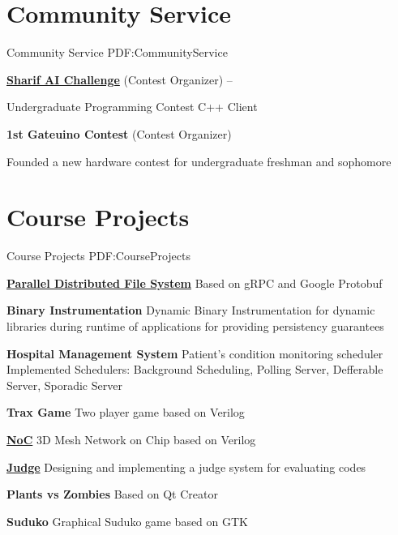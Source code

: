 \documentclass[a4paper,9pt,oneside]{article}
\begin{document}
\begin{body}
\section
{Community Service}
{Community Service}
{PDF:CommunityService}

\BulletItem
\href{https://github.com/SharifAIChallenge}{
\textbf{Sharif AI Challenge}} (Contest Organizer)
\hfill
{} --

\SubBulletItem
Undergraduate Programming Contest
\SubBulletItem
C++ Client

\BulletItem
\textbf{1st Gateuino Contest} (Contest Organizer)
\hfill
{}

\SubBulletItem
Founded a new hardware contest for undergraduate freshman and sophomore

\section
{Course Projects}
{Course Projects}
{PDF:CourseProjects}

\BulletItem
\href{https://github.com/arminvakil/PFS}
{\textbf{Parallel Distributed File System}}
\hfill
{}
\SubBulletItem
Based on gRPC and Google Protobuf

\BulletItem
\textbf{Binary Instrumentation}
\hfill
{}
\SubBulletItem
Dynamic Binary Instrumentation for dynamic libraries during runtime of applications for providing persistency guarantees

\BulletItem
{\textbf{Hospital Management System}
\hfill
{}
}
\SubBulletItem
Patient's condition monitoring scheduler
\SubBulletItem
Implemented Schedulers: Background Scheduling, Polling Server, Defferable Server, Sporadic Server

\BulletItem
{\textbf{Trax Game}
\hfill
{}
}
\SubBulletItem
Two player game based on Verilog

\BulletItem
\href{https://github.com/arminvakil/NoC}
{\textbf{NoC}}
\hfill
{}
\SubBulletItem
3D Mesh Network on Chip based on Verilog

\BulletItem
\href{https://github.com/Rmin1995/Judge}
{\textbf{Judge}}
\hfill
{}
\SubBulletItem
Designing and implementing a judge system for evaluating codes

\BulletItem
{\textbf{Plants vs Zombies}
\hfill
{}
}
\SubBulletItem
Based on Qt Creator

\BulletItem
{\textbf{Suduko}
\hfill
{}
}
\SubBulletItem
Graphical Suduko game based on GTK


\end{body}
\end{document}
